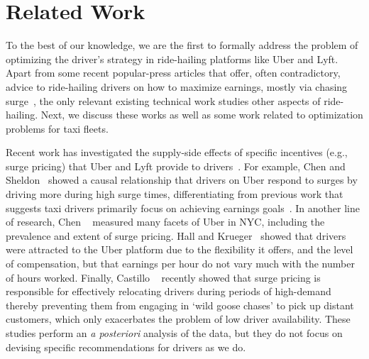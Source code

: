 
\section{Related Work}
\label{sec:related_work}

To the best of our knowledge, we are the first to formally address the problem of optimizing
the driver's strategy in ride-hailing platforms like Uber and Lyft. 
Apart from 
some recent popular-press articles that 
offer, often contradictory, advice to ride-hailing drivers on how to maximize earnings, mostly via chasing surge~\cite{dont,tips}, 
the only relevant existing technical work 
studies other aspects of ride-hailing. 
Next, we discuss these works as well as some work related to optimization problems
for taxi fleets.


Recent work has investigated the supply-side effects of specific incentives (e.g., surge pricing) that Uber and Lyft provide to drivers~\cite{slaves}.  For example, Chen and Sheldon~\cite{chen2016dynamic} showed a causal relationship that drivers on Uber respond to surges by driving more during high surge times,  differentiating from previous work that suggests taxi drivers primarily focus on achieving earnings goals~\cite{camerer1997labor}. 
In another line of research,
Chen {\etal}~\cite{chen2015peeking} measured many facets of Uber in NYC, including the prevalence and extent 
  of surge pricing.
Hall and Krueger~\cite{hall2016analysis} showed that drivers were attracted to the Uber platform due to the flexibility it offers, 
and the level of compensation, but that earnings per hour do not vary much with the number of hours worked. 
Finally, Castillo {\etal}~\cite{castillo2017surge} recently showed that surge pricing is responsible for effectively 
  relocating drivers during periods of high-demand thereby preventing them from engaging in `wild goose chases' 
  to pick up distant customers, which only exacerbates the problem of low driver availability.
These studies perform an {\em a posteriori} analysis of the data,
but they do not focus on devising specific recommendations for drivers as we do.


